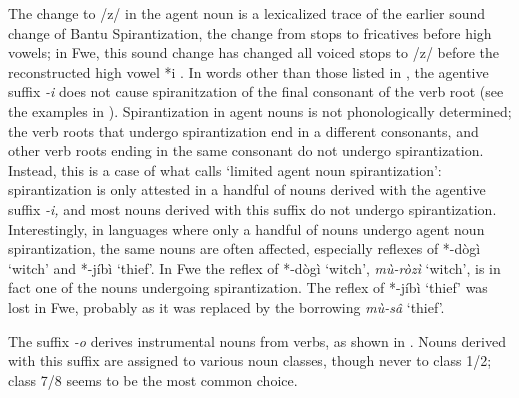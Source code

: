 The change to /z/ in the agent noun is a lexicalized trace of the earlier sound change of Bantu Spirantization, the change from stops to fricatives before high vowels; in Fwe, this sound change has changed all voiced stops to /z/ before the reconstructed high vowel *i \citep[117-118]{Bostoen2009}. In words other than those listed in , the agentive suffix \textit{-i} does not cause spiranitzation of the final consonant of the verb root (see the examples in ). Spirantization in agent nouns is not phonologically determined; the verb roots that undergo spirantization end in a different consonants, and other verb roots ending in the same consonant do not undergo spirantization. Instead, this is a case of what {\citet{Bostoen2008}} calls ‘limited agent noun spirantization’: spirantization is only attested in a handful of nouns derived with the agentive suffix \textit{-i,} and most nouns derived with this suffix do not undergo spirantization. Interestingly, in languages where only a handful of nouns undergo agent noun spirantization, the same nouns are often affected, especially reflexes of *-dògì ‘witch’ and *-jíbì ‘thief’. In Fwe the reflex of *-dògì ‘witch’, \textit{mù-ròzì} ‘witch’, is in fact one of the nouns undergoing spirantization. The reflex of *-jíbì ‘thief’ was lost in Fwe, probably as it was replaced by the borrowing \textit{mù-sâ} ‘thief’.

The suffix \textit{-o} derives instrumental nouns from verbs, as shown in . Nouns derived with this suffix are assigned to various noun classes, though never to class 1/2; class 7/8 seems to be the most common choice.

